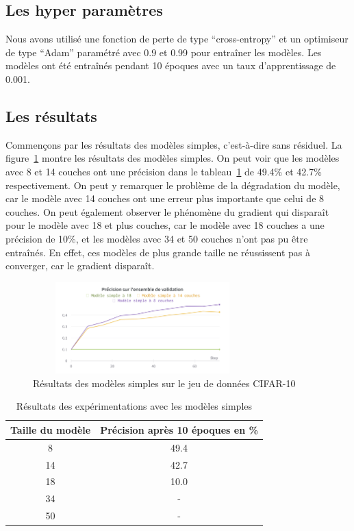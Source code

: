 \documentclass{article}
\begin{document}
\subsection{Les hyper paramètres}

Nous avons utilisé une fonction de perte de type ``cross-entropy'' et un optimiseur de type ``Adam'' paramétré avec 0.9 et 0.99
pour entraîner les modèles.
Les modèles ont été entraînés pendant 10 époques avec un taux d'apprentissage de 0.001.

\subsection{Les résultats}

Commençons par les résultats des modèles simples, c'est-à-dire sans résiduel. La figure~\ref{fig:result_plain} montre
les résultats des modèles simples. On peut voir que les modèles avec 8 et 14 couches ont une précision dans le tableau~\ref{tab:result_plain}
de 49.4\% et 42.7\% respectivement. On peut y remarquer le problème de la dégradation du modèle, car le modèle avec 14 couches ont une erreur
plus importante que celui de 8 couches. On peut également observer le phénomène du gradient qui disparaît pour le modèle avec 18 et plus couches,
car le modèle avec 18 couches a une précision de 10\%, et les modèles avec 34 et 50 couches n'ont pas pu être entraînés.
En effet, ces modèles de plus grande taille ne réussissent pas à converger, car le gradient disparaît.

\begin{figure}[h]
    \centering
    \includegraphics[width=240pt,height=100pt]{./img/result_plain.png}
    \caption{Résultats des modèles simples sur le jeu de données CIFAR-10}\label{fig:result_plain}
\end{figure}

\begin{table}[H]
    \centering
    \begin{tabular}{cc}
    \hline
    Taille du modèle & Précision après 10 époques en \% \\
    \hline
    8 & 49.4 \\
    14 & 42.7 \\
    18 & 10.0 \\
    34 & - \\
    50 & - \\
    \hline
    \end{tabular}
    \caption{Résultats des expérimentations avec les modèles simples}\label{tab:result_plain}
\end{table}
\end{document}
